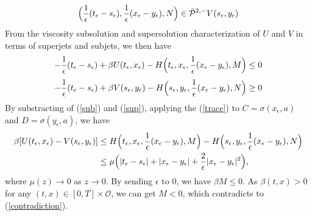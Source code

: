 \documentclass[12pt,a4paper]{ctexart}
\begin{document}
\begin{equation*}
    \Big{(} \frac{1}{\epsilon}(t_\epsilon - s_\epsilon), \frac{1}{\epsilon} (x_{\epsilon} - y_{\epsilon}), N \Big{)} \in \bar{\mathcal{P}}^{2,-} V(s_\epsilon, y_\epsilon)
\end{equation*}
From the viscosity subsolution and supersolution characterization of $U$ and $V$ in terms of superjets and subjets, we then have
\begin{equation} \label{sub}
    - \frac{1}{\epsilon} (t_\epsilon - s_\epsilon) + \beta U(t_\epsilon, x_\epsilon) - H \Big{(} t_\epsilon, x_\epsilon, \frac{1}{\epsilon} (x_{\epsilon} - y_{\epsilon}), M \Big{)} \leq 0
\end{equation}
\begin{equation} \label{sup}
    - \frac{1}{\epsilon} (t_\epsilon - s_\epsilon) + \beta V(s_\epsilon, y_\epsilon) - H \Big{(} s_\epsilon, y_\epsilon, \frac{1}{\epsilon} (x_{\epsilon} - y_{\epsilon}), N \Big{)} \geq 0
\end{equation}
By substracting of (\ref{sub}) and (\ref{sup}), applying the (\ref{trace}) to $C = \sigma(x_\epsilon, a)$ and $D = \sigma(y_\epsilon, a)$, we have
\begin{align*}
    \beta [U(t_\epsilon, x_\epsilon) - V(s_\epsilon, y_\epsilon)] & \leq H \Big{(} t_\epsilon, x_\epsilon, \frac{1}{\epsilon} (x_{\epsilon} - y_{\epsilon}), M \Big{)} - H \Big{(} s_\epsilon, y_\epsilon, \frac{1}{\epsilon} (x_{\epsilon} - y_{\epsilon}), N \Big{)}  \\
    & \leq \mu \Big{(} |t_\epsilon - s_\epsilon| +|x_\epsilon - y_\epsilon| + \frac{2}{\epsilon} |x_{\epsilon} - y_{\epsilon}|^{2} \Big{)},
\end{align*}
where $\mu(z) \to 0$ as $z \to 0$. By sending $\epsilon$ to $0$, we have $\beta M \leq 0$. As $\beta(t,x) >0$ for any $(t,x) \in [0, T] \times \mathcal{O}$, we can get $M < 0$, which contradicts to (\ref{contradiction}). 
\end{document}
